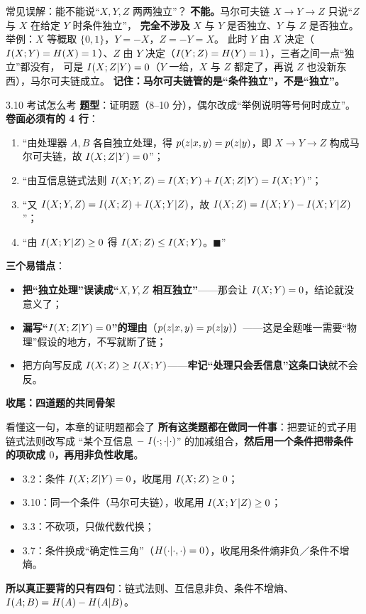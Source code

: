 \documentclass[11pt,a4paper]{ctexart}
\begin{document}
\begin{qa}{常见误解：能不能说“$X,Y,Z$ 两两独立”？}
\textbf{不能。}马尔可夫链 $X\to Y\to Z$ 只说“$Z$ 与 $X$ 在给定 $Y$ 时条件独立”，
\textbf{完全不涉及} $X$ 与 $Y$ 是否独立、$Y$ 与 $Z$ 是否独立。举例：$X$ 等概取 $\{0,1\}$，$Y=-X$，$Z=-Y=X$。
此时 $Y$ 由 $X$ 决定（$I\!\left(X;Y\right)=H\!\left(X\right)=1$）、$Z$ 由 $Y$ 决定（$I\!\left(Y;Z\right)=H\!\left(Y\right)=1$），三者之间一点“独立”都没有，
可是 $I\!\left(X;Z|Y\right)=0$（$Y$ 一给，$X$ 与 $Z$ 都定了，再说 $Z$ 也没新东西），马尔可夫链成立。
\textbf{记住：马尔可夫链管的是“条件独立”，不是“独立”。}
\end{qa}

\begin{exam}{3.10 考试怎么考}
\textbf{题型}：证明题（8--10 分），偶尔改成“举例说明等号何时成立”。
\textbf{卷面必须有的 4 行}：
\begin{enumerate}[leftmargin=1.7em,itemsep=1pt,topsep=1pt]
  \item “由处理器 $A,B$ 各自独立处理，得 $p\!\left(z|x,y\right)=p\!\left(z|y\right)$，即 $X\to Y\to Z$ 构成马尔可夫链，故 $I\!\left(X;Z|Y\right)=0$”；
  \item “由互信息链式法则 $I\!\left(X;Y,Z\right)=I\!\left(X;Y\right)+I\!\left(X;Z|Y\right)=I\!\left(X;Y\right)$”；
  \item “又 $I\!\left(X;Y,Z\right)=I\!\left(X;Z\right)+I\!\left(X;Y|Z\right)$，故 $I\!\left(X;Z\right)=I\!\left(X;Y\right)-I\!\left(X;Y|Z\right)$”；
  \item “由 $I\!\left(X;Y|Z\right)\ge0$ 得 $I\!\left(X;Z\right)\le I\!\left(X;Y\right)$。$\blacksquare$”
\end{enumerate}
\textbf{三个易错点}：
\begin{itemize}[leftmargin=1.5em,itemsep=1pt,topsep=1pt]
  \item \textbf{把“独立处理”误读成“$X,Y,Z$ 相互独立”}——那会让 $I\!\left(X;Y\right)=0$，结论就没意义了；
  \item \textbf{漏写“$I\!\left(X;Z|Y\right)=0$”的理由}（$p\!\left(z|x,y\right)=p\!\left(z|y\right)$）——这是全题唯一需要“物理”假设的地方，不写就断了链；
  \item 把方向写反成 $I\!\left(X;Z\right)\ge I\!\left(X;Y\right)$——\textbf{牢记“处理只会丢信息”这条口诀}就不会反。
\end{itemize}
\end{exam}

\begin{center}
{\large\bfseries 收尾：四道题的共同骨架}
\end{center}

\begin{idea}{看懂这一句，本章的证明题都会了}
\textbf{所有这类题都在做同一件事}：把要证的式子用链式法则改写成
“某个互信息 $-\ I\!\left(\cdot;\cdot|\cdot\right)$” 的加减组合，\textbf{然后用一个条件把带条件的项砍成 $0$，再用非负性收尾}。
\begin{itemize}[leftmargin=1.5em,itemsep=1pt,topsep=1pt]
  \item 3.2：条件 $I\!\left(X;Z|Y\right)=0$，收尾用 $I\!\left(X;Z\right)\ge0$；
  \item 3.10：同一个条件（马尔可夫链），收尾用 $I\!\left(X;Y|Z\right)\ge0$；
  \item 3.3：不砍项，只做代数代换；
  \item 3.7：条件换成“确定性三角”（$H\!\left(\cdot|\cdot,\cdot\right)=0$），收尾用条件熵非负／条件不增熵。
\end{itemize}
\textbf{所以真正要背的只有四句}：链式法则、互信息非负、条件不增熵、$I\!\left(A;B\right)=H\!\left(A\right)-H\!\left(A|B\right)$。
\end{idea}
\end{document}
